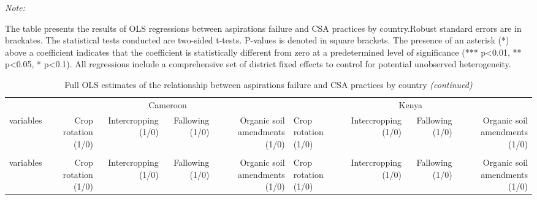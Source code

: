 \documentclass[
]{article}
\begin{document}
\begin{landscape}\begingroup\fontsize{7}{9}\selectfont

\begin{ThreePartTable}
\begin{TableNotes}[para]
\item \textit{Note: } 
\item The table presents the results of OLS regressions between aspirations failure and CSA practices by country.Robust standard errors are in brackates. The statistical tests conducted are two-sided t-tests. P-values is denoted in square brackets. The presence of an asterisk (*) above a coefficient indicates that the coefficient is statistically different from zero at a predetermined level of significance (*** p<0.01, ** p<0.05, * p<0.1). All regressions include a comprehensive set of district fixed effects to control for potential unobserved heterogeneity.
\end{TableNotes}
\begin{longtable}[t]{lrrrrlrrr}
\caption{\label{tab:unnamed-chunk-11} Full OLS estimates of the relationship between aspirations failure and CSA practices by country}\\
\toprule
\multicolumn{1}{c}{ } & \multicolumn{4}{c}{Cameroon} & \multicolumn{4}{c}{Kenya} \\
\cmidrule(l{3pt}r{3pt}){2-5} \cmidrule(l{3pt}r{3pt}){6-9}
variables & Crop rotation (1/0) & Intercropping (1/0) & Fallowing (1/0) & Organic soil amendments (1/0) & Crop rotation (1/0) & Intercropping (1/0) & Fallowing (1/0) & Organic soil amendments (1/0)\\
\midrule
\endfirsthead
\caption[]{\label{tab:unnamed-chunk-11} Full OLS estimates of the relationship between aspirations failure and CSA practices by country \textit{(continued)}}\\
\toprule
variables & Crop rotation (1/0) & Intercropping (1/0) & Fallowing (1/0) & Organic soil amendments (1/0) & Crop rotation (1/0) & Intercropping (1/0) & Fallowing (1/0) & Organic soil amendments (1/0)\\
\midrule
\endhead


\end{longtable}
\end{ThreePartTable}
\end{landscape}
\end{document}
